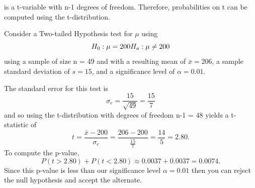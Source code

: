 \documentclass[10pt,]{book}
\numberwithin{equation}{section}
\newcommand{\lt}{<}
\newcommand{\gt}{>}
\begin{document}
is a t-variable with n-1 degrees of freedom. Therefore, probabilities on t can be computed using the t-distribution.%
\par
\hypertarget{p-1397}{}%
Consider a Two-tailed Hypothesis test for \(\mu\) using%
\begin{equation*}
H_0 : \mu = 200 \\ H_a: \mu \neq 200
\end{equation*}
using a sample of size n = 49 and with a resulting mean of \(\overline{x} = 206\), a sample standard deviation of \(s = 15\), and a significance level of \(\alpha = 0.01\).%
\par
\hypertarget{p-1398}{}%
The standard error for this test is%
\begin{equation*}
\sigma_e = \frac{15}{\sqrt{49}} = \frac{15}{7}
\end{equation*}
and so using the t-distribution with degrees of freedom n-1 = 48 yields a t-statistic of%
\begin{equation*}
t = \frac{\overline{x} - 200}{\sigma_e} = \frac{206-200}{\frac{15}{7}} = \frac{14}{5} = 2.80.
\end{equation*}
To compute the p-value,%
\begin{equation*}
P(t \gt 2.80) + P(t \lt 2.80) \approx 0.0037 + 0.0037 = 0.0074.
\end{equation*}
Since this p-value is less than our significance level \(\alpha = 0.01\) then you can reject the null hypothesis and accept the alternate.%
\par
\hypertarget{p-1399}{}%
\end{document}
